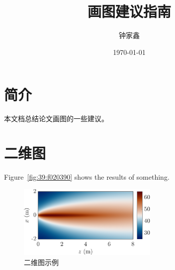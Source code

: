 \documentclass{article}
\title{\textbf{画图建议指南}}
\author{钟家鑫}
\date{\today}
\begin{document}
\maketitle
\thispagestyle{firststyle}

\section{简介}
本文档总结论文画图的一些建议。

\section{二维图}
Figure~\ref{fig:39:f020390} shows the results of something.
\begin{figure}[!htb]
    \centering
    \includegraphics[width = 0.6\textwidth]{fig.pdf}
    \caption{二维图示例}
    \label{fig:2d_fig}
\end{figure}



\printbibliography[title=参考文献]
\end{document}
